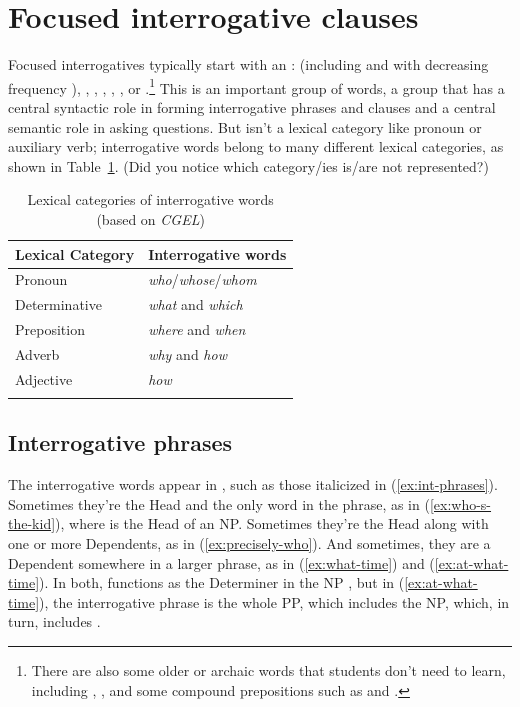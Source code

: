 \section{Focused interrogative clauses}\label{sec:focused interrogatives}

Focused interrogatives typically start with an :  (including  and with decreasing frequency ), , , , , , or .\footnote{There are also some older or archaic words that students don't need to learn, including , , and some compound prepositions such as  and .} This is an important group of words, a group that has a central syntactic role in forming interrogative phrases and clauses and a central semantic role in asking questions. But  isn't a lexical category like pronoun or auxiliary verb; interrogative words belong to many different lexical categories, as shown in Table~\ref{tab:q-words}. (Did you notice which category/ies is/are not represented?)

\begin{table}
    \begin{tabular}{ll}
        \lsptoprule
        Lexical Category & Interrogative words \\
        \midrule
        Pronoun & \textit{who}/\textit{whose}/\textit{whom} \\
        Determinative & \textit{what} and \textit{which} \\
        Preposition & \textit{where} and \textit{when} \\
        Adverb & \textit{why} and \textit{how}\\
        Adjective & \textit{how}   \\
        \lspbottomrule
        \end{tabular}
    \caption{Lexical categories of interrogative words (based on \textit{CGEL})} \label{tab:q-words}
\end{table}

\subsection{Interrogative phrases} \label{sec:interrogative-phrases}
The interrogative words appear in , such as those italicized in (\ref{ex:int-phrases}). Sometimes they're the \textsf{Head} and the only word in the phrase, as in (\ref{ex:who-s-the-kid}), where  is the \textsf{Head} of an NP. Sometimes they're the \textsf{Head} along with one or more \textsf{Dependents}, as in (\ref{ex:precisely-who}). And sometimes, they are a \textsf{Dependent} somewhere in a larger phrase, as in (\ref{ex:what-time}) and (\ref{ex:at-what-time}). In both,  functions as the \textsf{Determiner} in the NP , but in (\ref{ex:at-what-time}), the interrogative phrase is the whole  PP, which includes the NP, which, in turn, includes .


